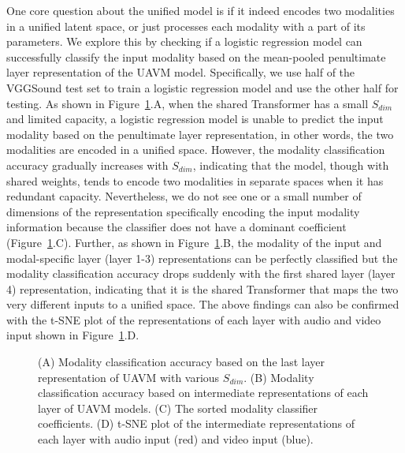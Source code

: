 \documentclass[journal]{IEEEtran}
\newcommand{\squeezeup}{\vspace{-1.6mm}}
\begin{document}
One core question about the unified model is if it indeed encodes two modalities in a unified latent space, or just processes each modality with a part of its parameters. We explore this by checking if a logistic regression model can successfully classify the input modality based on the mean-pooled penultimate layer representation of the UAVM model. Specifically, we use half of the VGGSound test set to train a logistic regression model and use the other half for testing. As shown in Figure~\ref{fig:exp2}.A, when the shared Transformer has a small $S_{dim}$ and limited capacity, a logistic regression model is unable to predict the input modality based on the penultimate layer representation, in other words, the two modalities are encoded in a unified space. However, the modality classification accuracy gradually increases with $S_{dim}$, indicating that the model, though with shared weights, tends to encode two modalities in separate spaces when it has redundant capacity. Nevertheless, we do not see one or a small number of dimensions of the representation specifically encoding the input modality information because the classifier does not have a dominant coefficient (Figure~\ref{fig:exp2}.C). Further, as shown in Figure~\ref{fig:exp2}.B, the modality of the input and modal-specific layer (layer 1-3) representations can be perfectly classified but the modality classification accuracy drops suddenly with the first shared layer (layer 4) representation, indicating that it is the shared Transformer that maps the two very different inputs to a unified space. The above findings can also be confirmed with the t-SNE plot of the representations of each layer with audio and video input shown in Figure~\ref{fig:exp2}.D.

\begin{figure}[t]
\squeezeup\squeezeup

\vspace{-1.0em}
\caption{(A) Modality classification accuracy based on the last layer representation of UAVM with various $S_{dim}$. (B) Modality classification accuracy based on intermediate representations of each layer of UAVM models. (C) The sorted modality classifier coefficients. (D) t-SNE plot of the intermediate representations of each layer with audio input (red) and video input (blue). }
\label{fig:exp2}
\vspace{-1.0em}
\end{figure}
\end{document}
